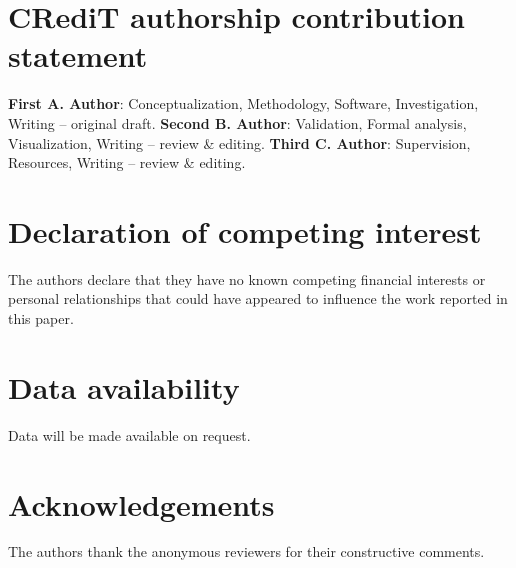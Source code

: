\documentclass[preprint,12pt]{elsarticle}
\begin{document}
\section*{CRediT authorship contribution statement}
\textbf{First A. Author}: Conceptualization, Methodology, Software,
Investigation, Writing -- original draft.
\textbf{Second B. Author}: Validation, Formal analysis, Visualization,
Writing -- review \& editing.
\textbf{Third C. Author}: Supervision, Resources, Writing -- review \& editing.

\section*{Declaration of competing interest}
The authors declare that they have no known competing financial interests or
personal relationships that could have appeared to influence the work reported
in this paper.

\section*{Data availability}
Data will be made available on request.

\section*{Acknowledgements}
The authors thank the anonymous reviewers for their constructive comments.

%
%     


\end{document}
